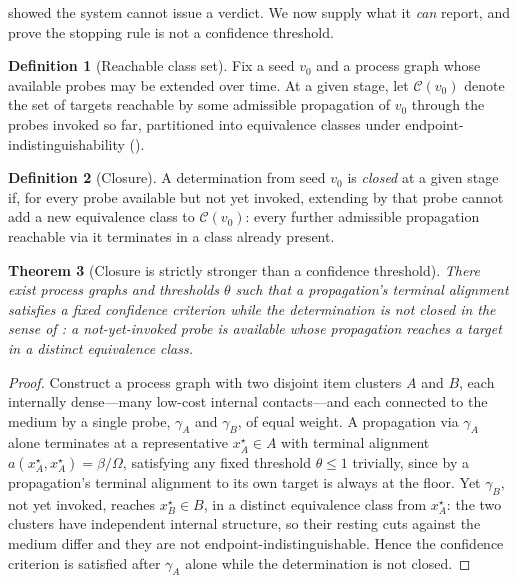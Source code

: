 \documentclass[11pt,twocolumn,a4paper]{article}
\theoremstyle{dirthm}
\newtheorem{theorem}{Theorem}[section]
\theoremstyle{definition}
\newtheorem{definition}[theorem]{Definition}
\theoremstyle{remark}
\newcommand{\flo}{\beta}
\newcommand{\al}{a}
\newcommand{\Om}{\Omega}
\newcommand{\Cell}{\mathcal{C}}
\begin{document}
 showed the system cannot issue a verdict. We now supply
what it \emph{can} report, and prove the stopping rule is not a confidence
threshold.

\begin{definition}[Reachable class set]
\label{def:class-set}
Fix a seed $v_0$ and a process graph whose available probes may be extended
over time. At a given stage, let $\Cell(v_0)$ denote the set of targets
reachable by some admissible propagation of $v_0$ through the probes invoked
so far, partitioned into equivalence classes under
endpoint-indistinguishability ().
\end{definition}

\begin{definition}[Closure]
\label{def:closure}
A determination from seed $v_0$ is \emph{closed} at a given stage if, for
every probe available but not yet invoked, extending by that probe cannot add
a new equivalence class to $\Cell(v_0)$: every further admissible propagation
reachable via it terminates in a class already present.
\end{definition}

\begin{theorem}[Closure is strictly stronger than a confidence threshold]
\label{thm:closure-stronger}
There exist process graphs and thresholds $\theta$ such that a propagation's
terminal alignment satisfies a fixed confidence criterion while the
determination is not closed in the sense of : a
not-yet-invoked probe is available whose propagation reaches a target in a
distinct equivalence class.
\end{theorem}

\begin{proof}
Construct a process graph with two disjoint item clusters $A$ and $B$, each
internally dense---many low-cost internal contacts---and each connected to
the medium by a single probe, $\gamma_A$ and $\gamma_B$, of equal weight. A
propagation via $\gamma_A$ alone terminates at a representative
$x^{\star}_A\in A$ with terminal alignment
$\al(x^{\star}_A,x^{\star}_A)=\flo/\Om$, satisfying any fixed threshold
$\theta\le1$ trivially, since by  a propagation's
terminal alignment to its own target is always at the floor. Yet $\gamma_B$,
not yet invoked, reaches $x^{\star}_B\in B$, in a distinct equivalence class
from $x^{\star}_A$: the two clusters have independent internal structure, so
their resting cuts against the medium differ and they are not
endpoint-indistinguishable. Hence the confidence criterion is satisfied after
$\gamma_A$ alone while the determination is not closed.
\end{proof}
\end{document}
